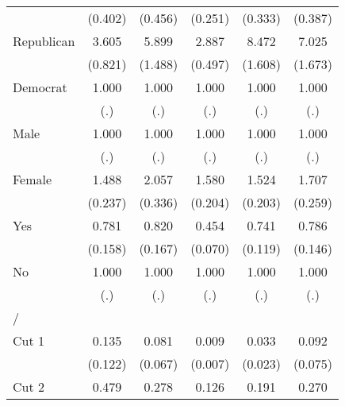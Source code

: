 \begin{table}[htbp]
\begin{tabular}{l*{5}{c}}
                &  (0.402)         &  (0.456)         &  (0.251)         &  (0.333)         &  (0.387)         \\
[1em]
Republican      &    3.605\sym{***}&    5.899\sym{***}&    2.887\sym{***}&    8.472\sym{***}&    7.025\sym{***}\\
                &  (0.821)         &  (1.488)         &  (0.497)         &  (1.608)         &  (1.673)         \\
[1em]
Democrat        &    1.000         &    1.000         &    1.000         &    1.000         &    1.000         \\
                &      (.)         &      (.)         &      (.)         &      (.)         &      (.)         \\
[1em]
Male            &    1.000         &    1.000         &    1.000         &    1.000         &    1.000         \\
                &      (.)         &      (.)         &      (.)         &      (.)         &      (.)         \\
[1em]
Female          &    1.488\sym{**} &    2.057\sym{***}&    1.580\sym{***}&    1.524\sym{***}&    1.707\sym{***}\\
                &  (0.237)         &  (0.336)         &  (0.204)         &  (0.203)         &  (0.259)         \\
[1em]
Yes             &    0.781         &    0.820         &    0.454\sym{***}&    0.741\sym{*}  &    0.786         \\
                &  (0.158)         &  (0.167)         &  (0.070)         &  (0.119)         &  (0.146)         \\
[1em]
No              &    1.000         &    1.000         &    1.000         &    1.000         &    1.000         \\
                &      (.)         &      (.)         &      (.)         &      (.)         &      (.)         \\
\hline
/               &                  &                  &                  &                  &                  \\
Cut 1           &    0.135\sym{**} &    0.081\sym{***}&    0.009\sym{***}&    0.033\sym{***}&    0.092\sym{***}\\
                &  (0.122)         &  (0.067)         &  (0.007)         &  (0.023)         &  (0.075)         \\
[1em]
Cut 2           &    0.479         &    0.278         &    0.126\sym{***}&    0.191\sym{**} &    0.270         \\

\end{tabular}
\end{table}
